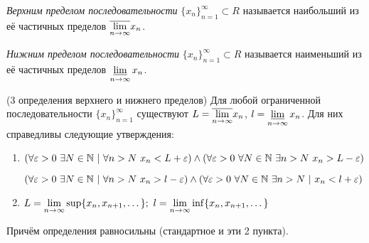 \begin{definition}
	\textit{Верхним пределом последовательности} $\{x_n\}_{n = 1}^\infty \subset R$ называется наибольший из её частичных пределов $\overline{\lim\limits_{n \rightarrow \infty}} x_n$.
\end{definition}

\begin{definition}
	\textit{Нижним пределом последовательности} $\{x_n\}_{n = 1}^\infty \subset R$ называется наименьший из её частичных пределов $\varliminf\limits_{n \rightarrow \infty} x_n$.
\end{definition}

\begin{theorem} (3 определения верхнего и нижнего пределов)
	Для любой ограниченной последовательности $\{x_n\}_{n = 1}^\infty$ существуют $L = \overline{\lim\limits_{n \to \infty}} x_n$, $l = \varliminf\limits_{n \to \infty} x_n$. Для них справедливы следующие утверждения:
	\begin{enumerate}
		\item $(\forall \eps > 0\ \exists N \in \N\ |\ \forall n > N\ x_n < L + \eps) \wedge (\forall \eps > 0\ \forall N \in \N\ \exists n > N\ x_n > L - \eps)$
		
		$(\forall \eps > 0\ \exists N \in \N\ |\ \forall n > N\ x_n > l - \eps) \wedge (\forall \eps > 0\ \forall N \in \N\ \exists n > N\ |\ x_n < l + \eps)$
		
		\item $L = \lim\limits_{n \to \infty} \sup \{x_n, x_{n + 1}, \dots\};\ l = \lim\limits_{n \to \infty} \inf \{x_n, x_{n + 1}, \dots\}$
	\end{enumerate}
	Причём определения равносильны (стандартное и эти 2 пункта).
\end{theorem}

